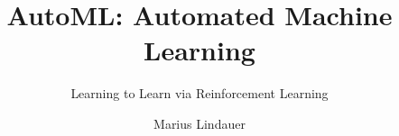 




\title[AutoML: Learning to Control]{AutoML: Automated Machine Learning}
\subtitle{Learning to Learn via Reinforcement Learning}
\author{Marius Lindauer}
\date{}





	
	\maketitle
	

